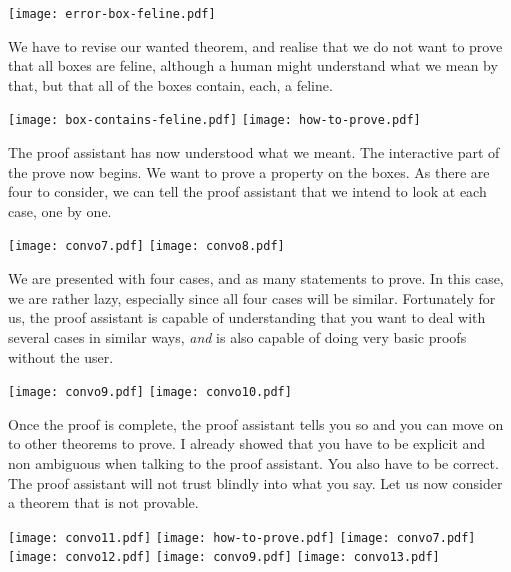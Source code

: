 \begin{center}
  \texttt{[image: error-box-feline.pdf]}
\end{center}

We have to revise our wanted theorem, and realise that we do not want to prove
that all boxes are feline, although a human might understand what we mean by
that, but that all of the boxes contain, each, a feline.

\begin{center}
  \texttt{[image: box-contains-feline.pdf]}
  \texttt{[image: how-to-prove.pdf]}
\end{center}

The proof assistant has now understood what we meant. The interactive part of
the prove now begins. We want to prove a property on the boxes. As there are
four to consider, we can tell the proof assistant that we intend to look at each
case, one by one.

\begin{center}
  \texttt{[image: convo7.pdf]}
  \texttt{[image: convo8.pdf]}
\end{center}

We are presented with four cases, and as many statements to prove.
In this case, we are rather lazy, especially since all four cases will be
similar. Fortunately for us, the proof assistant is capable of understanding
that you want to deal with several cases in similar ways, \emph{and} is also
capable of doing very basic proofs without the user.

\begin{center}
  \texttt{[image: convo9.pdf]}
  \texttt{[image: convo10.pdf]}
\end{center}

Once the proof is complete, the proof assistant tells you so and you can move on
to other theorems to prove. I already showed that you have to be explicit and
non ambiguous when talking to the proof assistant. You also have to be correct.
The proof assistant will not trust blindly into what you say.
%
Let us now consider a theorem that is not provable.

\begin{center}
  \texttt{[image: convo11.pdf]}
  \texttt{[image: how-to-prove.pdf]}
  \texttt{[image: convo7.pdf]}
  \texttt{[image: convo12.pdf]}
  \texttt{[image: convo9.pdf]}
  \texttt{[image: convo13.pdf]}
\end{center}

